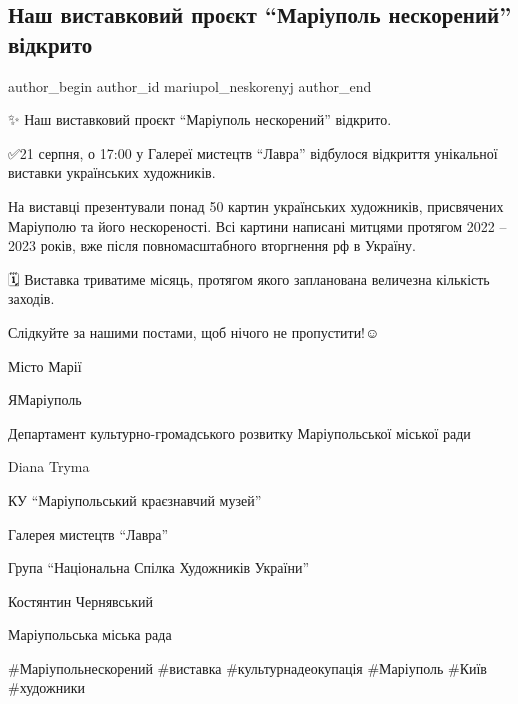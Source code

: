  
 
 
 
 

\subsection{Наш виставковий проєкт \enquote{Маріуполь нескорений} відкрито}
\label{sec:22_08_2023.fb.mariupol_neskorenyj.1.nash_vystavkovyj_proekt_mariupol_neskorenyj_vidkryto}

\ifcmt
 author_begin
   author_id mariupol_neskorenyj
 author_end
\fi

✨️ Наш виставковий проєкт \enquote{Маріуполь нескорений} відкрито.\par
✅21 серпня, о 17:00 у Галереї мистецтв \enquote{Лавра} відбулося відкриття унікальної  виставки українських художників. \par
На виставці презентували понад 50 картин українських художників, присвячених Маріуполю та його нескореності. Всі картини написані митцями протягом 2022 – 2023 років, вже після повномасштабного вторгнення рф в Україну.\par
🗓 Виставка триватиме місяць,  протягом якого запланована величезна кількість заходів. \par
Слідкуйте за нашими постами, щоб нічого не пропустити!☺️\par
Місто Марії \par
ЯМаріуполь \par
Департамент культурно-громадського розвитку Маріупольської міської ради \par
Diana Tryma\par
КУ \enquote{Маріупольський краєзнавчий музей} \par
Галерея мистецтв \enquote{Лавра} \par
Група \enquote{Національна Спілка Художників України}  \par
Костянтин Чернявський \par
Маріупольська міська рада \par
\#Маріупольнескорений \#виставка \#культурнадеокупація \#Маріуполь \#Київ \#художники\par
